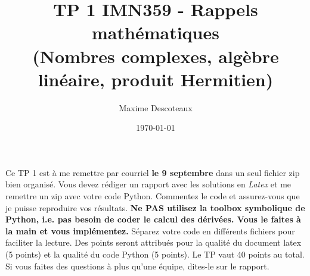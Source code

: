 \documentclass{article}
\title{TP 1 IMN359 - Rappels mathématiques \\
(Nombres complexes, algèbre linéaire, produit Hermitien)}
\author{Maxime Descoteaux}
\date{\today}
\begin{document}
\maketitle

Ce TP 1 est à me remettre par courriel {\bf le 9 septembre} 
dans un seul fichier zip bien organisé. 
Vous devez rédiger un rapport avec les solutions en 
\emph{Latex} et me remettre un zip avec votre code Python. Commentez
le code et assurez-vous que je puisse reproduire vos 
résultats. {\bf Ne PAS utilisez la toolbox symbolique de Python,
  i.e. pas besoin de coder le calcul des dérivées. Vous le faites à la
main et vous implémentez.}
Séparez votre code en différents fichiers pour faciliter la
lecture. Des points seront attribués pour la qualité du document latex
(5 points) et la qualité du code Python (5 points). Le TP vaut 40
points au total. Si vous faites des questions à plus qu'une équipe,
dites-le sur le rapport. 
\end{document}

